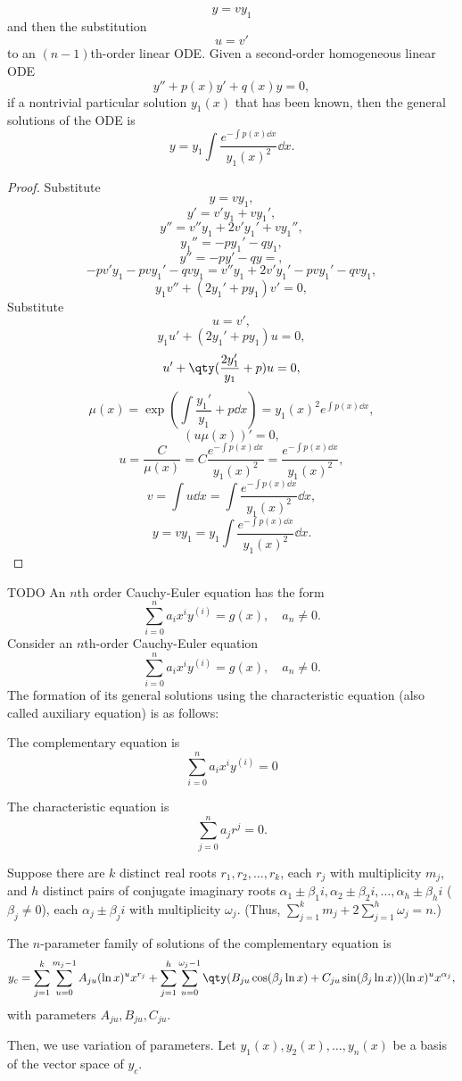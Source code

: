 \documentclass[a4paper,12pt]{report}
\begin{document}
\[y=vy_1\]
and then the substitution
\[u=v'\]
to an $(n-1)$th-order linear ODE.
Given a second-order homogeneous linear ODE
\[y''+p(x)y'+q(x)y=0,\]
if a nontrivial particular solution $y_1(x)$ that has been known, then the general solutions of the ODE is
\[y=y_1\int\frac{e^{-\int p(x)\dd{x}}}{y_1(x)^2}\dd{x}.\]
\begin{proof}
Substitute
\[y=vy_1,\]
\[y'=v'y_1+vy_1',\]
\[y''=v''y_1+2v'y_1'+vy_1'',\]
\[y_1''=-py_1'-qy_1,\]
\[y''=-py'-qy=,\]
\[-pv'y_1-pvy_1'-qvy_1=v''y_1+2v'y_1'-pvy_1'-qvy_1,\]
\[y_1v''+(2y_1'+py_1)v'=0,\]
Substitute
\[u=v',\]
\[y_1u'+(2y_1'+py_1)u=0,\]
\[u'+\qty(\frac{2y_1'}{y_1}+p)u=0,\]
\[\mu(x)=\exp(\int\frac{y_1'}{y_1}+p\dd{x})=y_1(x)^2e^{\int p(x)\dd{x}},\]
\[(u\mu(x))'=0,\]
\[u=\frac{C}{\mu(x)}=C\frac{e^{-\int p(x)\dd{x}}}{y_1(x)^2}=\frac{e^{-\int p(x)\dd{x}}}{y_1(x)^2},\]
\[v=\int u\dd{x}=\int\frac{e^{-\int p(x)\dd{x}}}{y_1(x)^2}\dd{x},\]
\[y=vy_1=y_1\int\frac{e^{-\int p(x)\dd{x}}}{y_1(x)^2}\dd{x}.\]
\end{proof}
TODO
An $n$th order Cauchy-Euler equation has the form
\[\sum_{i=0}^na_ix^iy^{(i)}=g(x),\quad a_n\ne 0.\]
Consider an $n$th-order Cauchy-Euler equation
\[\sum_{i=0}^na_ix^iy^{(i)}=g(x),\quad a_n\ne 0.\]
The formation of its general solutions using the characteristic equation (also called auxiliary equation) is as follows:
\ben
\item The complementary equation is
\[\sum_{i=0}^na_ix^iy^{(i)}=0\]
\item The characteristic equation is
\[\sum_{j=0}^na_jr^j=0.\]
\item Suppose there are $k$ distinct real roots $r_1,r_2,\ldots,r_k$, each $r_j$ with multiplicity $m_j$, and $h$ distinct pairs of conjugate imaginary roots $\alpha_1\pm\beta_1i,\alpha_2\pm\beta_2i,\ldots,\alpha_h\pm\beta_hi$ ($\beta_j\neq 0$), each $\alpha_j\pm\beta_ji$ with multiplicity $\omega_j$. (Thus, $\sum_{j=1}^km_j+2\sum_{j=1}^h\omega_j=n$.)
\item The $n$-parameter family of solutions of the complementary equation is
\[y_c=\sum_{j=1}^k\sum_{u=0}^{m_j-1}A_{ju}(\ln x)^ux^{r_j}+\sum_{j=1}^h\sum_{u=0}^{\omega_j-1}\qty(B_{ju}\cos(\beta_j\ln x)+C_{ju}\sin(\beta_j\ln x))(\ln x)^ux^{\alpha_j},\]
with parameters $A_{ju},B_{ju},C_{ju}$.
\item Then, we use variation of parameters. Let $y_1(x),y_2(x),\ldots,y_n(x)$ be a basis of the vector space of $y_c$.
\end{document}
